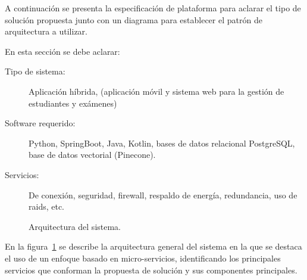 A continuación se presenta la especificación de plataforma para aclarar el tipo de solución propuesta junto con un diagrama para establecer el patrón de arquitectura a utilizar.
	
 En esta sección se debe aclarar:
	
\begin{description}
	\item[Tipo de sistema:] Aplicación híbrida, (aplicación móvil y sistema web para la gestión de estudiantes y exámenes)
	\item[Software requerido:] Python, SpringBoot, Java, Kotlin, bases de datos relacional PostgreSQL, base de datos vectorial (Pinecone).
	\item[Servicios:] De conexión, seguridad, firewall, respaldo de energía, redundancia, uso de raids, etc.
\end{description}



\begin{figure}[htbp!]
	\begin{center}
		\caption{Arquitectura del sistema.}
		\label{fig:arquitectura}
	\end{center}
\end{figure}

En la figura~\ref{fig:arquitectura} se describe la arquitectura general del sistema en la que se destaca el uso de un enfoque basado en micro-servicios, identificando los principales servicios que conforman la propuesta de solución y sus componentes principales.
